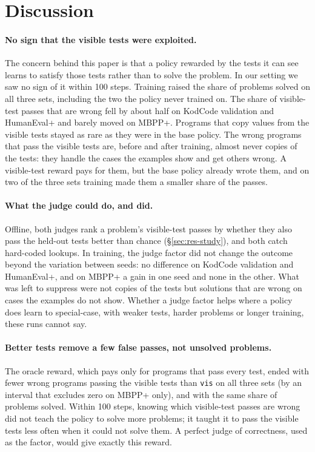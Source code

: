 
\section{Discussion}\label{sec:discussion}

\paragraph{No sign that the visible tests were exploited.} The concern behind this paper is that a policy rewarded by
the tests it can see learns to satisfy those tests rather than to solve the problem. In our setting we saw no sign of
it within 100 steps. Training raised the share of problems solved on all three sets, including the two the policy
never trained on. The share of visible-test passes that are wrong fell by about half on KodCode validation and
HumanEval+ and barely moved on MBPP+. Programs that copy values from the visible tests stayed as rare as they were in
the base policy. The wrong programs that pass the visible tests are, before and after training, almost never copies of
the tests: they handle the cases the examples show and get others wrong. A visible-test reward pays for them, but the
base policy already wrote them, and on two of the three sets training made them a smaller share of the passes.

\paragraph{What the judge could do, and did.} Offline, both judges rank a problem's visible-test passes by whether
they also pass the held-out tests better than chance (\S\ref{sec:res-study}), and both catch hard-coded lookups. In
training, the judge factor did not change the outcome beyond the variation between seeds: no difference on KodCode
validation and HumanEval+, and on MBPP+ a gain in one seed and none in the other. What was left to suppress were not
copies of the tests but solutions that are wrong on cases the examples do not show. Whether a judge factor helps where
a policy does learn to special-case, with weaker tests, harder problems or longer training, these runs cannot say.

\paragraph{Better tests remove a few false passes, not unsolved problems.} The oracle reward, which pays only for programs
that pass every test, ended with fewer wrong programs passing the visible tests than \texttt{vis} on all three sets (by
an interval that excludes zero on MBPP+ only), and with the same share of problems solved.
Within 100 steps, knowing which visible-test passes are wrong did not teach the policy to solve more problems; it
taught it to pass the visible tests less often when it could not solve them. A perfect judge of correctness, used as
the factor, would give exactly this reward.

